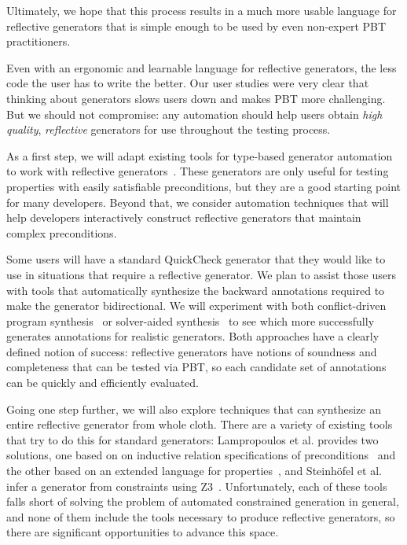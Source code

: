 Ultimately, we hope that this process results in a much more usable language for
reflective generators that is simple enough to be used by even non-expert PBT
practitioners.

%
Even with an ergonomic and learnable language for reflective generators, the
less code the user has to write the better. Our user studies were very clear
that thinking about generators slows users down and makes PBT more challenging.
But we should not compromise: any automation should help users obtain {\em high
quality}, {\em reflective} generators for use throughout the testing process.

As a first step, we will adapt existing tools for type-based generator
automation to work with reflective generators~\cite{noauthor_lysxia_nodate}.
These generators are only useful for testing properties with easily satisfiable
preconditions, but they are a good starting point for many developers. Beyond
that, we consider automation techniques that will help developers interactively
construct reflective generators that maintain complex preconditions.

Some users will have a standard QuickCheck generator that they would like to use
in situations that require a reflective generator. We plan to assist those
users with tools that automatically synthesize the backward annotations
required to make the generator bidirectional. We will experiment with both
conflict-driven program synthesis~\cite{feng_program_2018} or solver-aided
synthesis~\cite{torlak_growing_2013} to see which more successfully generates
annotations for realistic generators. Both approaches have a clearly defined
notion of success: reflective generators have notions of soundness and
completeness that can be tested via PBT, so each candidate set of annotations
can be quickly and efficiently evaluated.

Going one step further, we will also explore techniques that can synthesize an
entire reflective generator from whole cloth. There are a variety of existing
tools that try to do this for standard generators: Lampropoulos et al. provides
two solutions, one based on on inductive relation specifications of
preconditions~\cite{lampropoulos2017generating} and the other based on an
extended language for properties~\cite{beginners-luck}, and Steinh\"ofel et al.
infer a generator from constraints using
Z3~\cite{steinhofel_input_2022,de_moura_z3_2008}. Unfortunately, each of these
tools falls short of solving the problem of automated constrained generation in
general, and none of them include the tools necessary to produce reflective
generators, so there are significant opportunities to advance this space.


